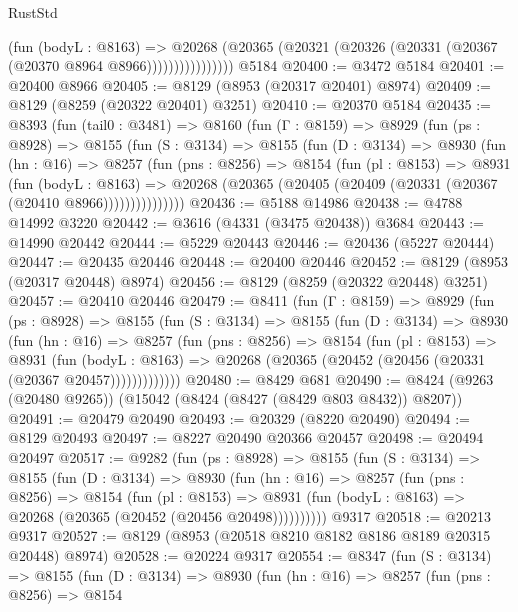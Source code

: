 \begin{lexlean}{RustStd}
\begin{coremodule}
                      (fun (bodyL : @8163) =>
                      @20268
                        (@20365 (@20321 (@20326 (@20331 (@20367 (@20370 @8964 @8966))))))))))))))))
    @5184
@20400 := @3472 @5184
@20401 := @20400 @8966
@20405 := @8129 (@8953 (@20317 @20401) @8974)
@20409 := @8129 (@8259 (@20322 @20401) @3251)
@20410 := @20370 @5184
@20435 := @8393
    (fun (tail0 : @3481) =>
    @8160
      (fun (Γ : @8159) =>
      @8929
        (fun (ps : @8928) =>
        @8155
          (fun (S : @3134) =>
          @8155
            (fun (D : @3134) =>
            @8930
              (fun (hn : @16) =>
              @8257
                (fun (pns : @8256) =>
                @8154
                  (fun (pl : @8153) =>
                  @8931
                    (fun (bodyL : @8163) =>
                    @20268 (@20365 (@20405 (@20409 (@20331 (@20367 (@20410 @8966)))))))))))))))
@20436 := @5188 @14986
@20438 := @4788 @14992 @3220
@20442 := @3616 (@4331 (@3475 @20438)) @3684
@20443 := @14990 @20442
@20444 := @5229 @20443
@20446 := @20436 (@5227 @20444)
@20447 := @20435 @20446
@20448 := @20400 @20446
@20452 := @8129 (@8953 (@20317 @20448) @8974)
@20456 := @8129 (@8259 (@20322 @20448) @3251)
@20457 := @20410 @20446
@20479 := @8411
    (fun (Γ : @8159) =>
    @8929
      (fun (ps : @8928) =>
      @8155
        (fun (S : @3134) =>
        @8155
          (fun (D : @3134) =>
          @8930
            (fun (hn : @16) =>
            @8257
              (fun (pns : @8256) =>
              @8154
                (fun (pl : @8153) =>
                @8931
                  (fun (bodyL : @8163) =>
                  @20268 (@20365 (@20452 (@20456 (@20331 (@20367 @20457)))))))))))))
@20480 := @8429 @681
@20490 := @8424 (@9263 (@20480 @9265)) (@15042 (@8424 (@8427 (@8429 @803 @8432)) @8207))
@20491 := @20479 @20490
@20493 := @20329 (@8220 @20490)
@20494 := @8129 @20493
@20497 := @8227 @20490 @20366 @20457
@20498 := @20494 @20497
@20517 := @9282
    (fun (ps : @8928) =>
    @8155
      (fun (S : @3134) =>
      @8155
        (fun (D : @3134) =>
        @8930
          (fun (hn : @16) =>
          @8257
            (fun (pns : @8256) =>
            @8154
              (fun (pl : @8153) =>
              @8931 (fun (bodyL : @8163) => @20268 (@20365 (@20452 (@20456 @20498))))))))))
    @9317
@20518 := @20213 @9317
@20527 := @8129 (@8953 (@20518 @8210 @8182 @8186 @8189 @20315 @20448) @8974)
@20528 := @20224 @9317
@20554 := @8347
    (fun (S : @3134) =>
    @8155
      (fun (D : @3134) =>
      @8930
        (fun (hn : @16) =>
        @8257
          (fun (pns : @8256) =>
          @8154

\end{coremodule}
\end{lexlean}
